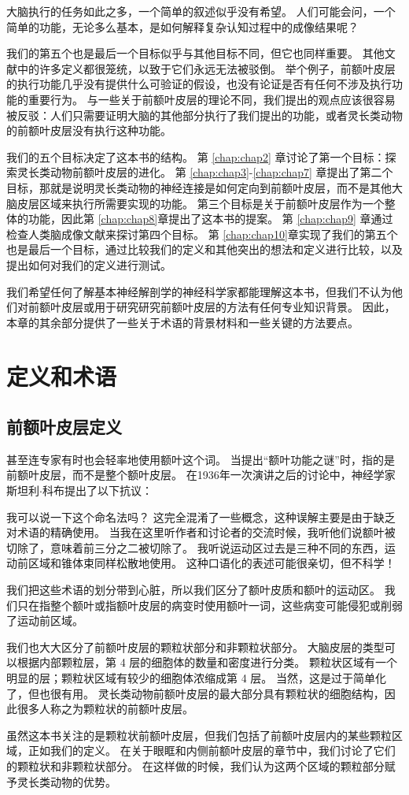 大脑执行的任务如此之多，一个简单的叙述似乎没有希望。
人们可能会问，一个简单的功能，无论多么基本，是如何解释复杂认知过程中的成像结果呢？
\par
我们的第五个也是最后一个目标似乎与其他目标不同，但它也同样重要。
其他文献中的许多定义都很笼统，以致于它们永远无法被驳倒。
举个例子，前额叶皮层的执行功能几乎没有提供什么可验证的假设，也没有论证是否有任何不涉及执行功能的重要行为。
与一些关于前额叶皮层的理论不同，我们提出的观点应该很容易被反驳：人们只需要证明大脑的其他部分执行了我们提出的功能，或者灵长类动物的前额叶皮层没有执行这种功能。
\par
我们的五个目标决定了这本书的结构。
第 \ref{chap:chap2} 章讨论了第一个目标：探索灵长类动物前额叶皮层的进化。
第 \ref{chap:chap3}-\ref{chap:chap7} 章提出了第二个目标，那就是说明灵长类动物的神经连接是如何定向到前额叶皮层，而不是其他大脑皮层区域来执行所需要实现的功能。
第三个目标是关于前额叶皮层作为一个整体的功能，因此第 \ref{chap:chap8}章提出了这本书的提案。
第 \ref{chap:chap9} 章通过检查人类脑成像文献来探讨第四个目标。
第 \ref{chap:chap10}章实现了我们的第五个也是最后一个目标，通过比较我们的定义和其他突出的想法和定义进行比较，以及提出如何对我们的定义进行测试。
\par
我们希望任何了解基本神经解剖学的神经科学家都能理解这本书，但我们不认为他们对前额叶皮层或用于研究研究前额叶皮层的方法有任何专业知识背景。
因此，本章的其余部分提供了一些关于术语的背景材料和一些关键的方法要点。



\section{定义和术语}
\subsection{前额叶皮层定义}
甚至连专家有时也会轻率地使用额叶这个词。
当提出“额叶功能之谜”时，指的是前额叶皮层，而不是整个额叶皮层\cite{teube1964riddle}。
在1936年一次演讲之后的讨论中，神经学家斯坦利$\cdot$科布提出了以下抗议\cite{fulton1932relation}：
\par
我可以说一下这个命名法吗？
这完全混淆了一些概念，这种误解主要是由于缺乏对术语的精确使用。
当我在这里听作者和讨论者的交流时候，我听他们说额叶被切除了，意味着前三分之二被切除了。
我听说运动区过去是三种不同的东西，运动前区域和锥体束同样松散地使用。
这种口语化的表述可能很亲切，但不科学！
\par
我们把这些术语的划分带到心脏，所以我们区分了额叶皮质和额叶的运动区。
我们只在指整个额叶或指额叶皮层的病变时使用额叶一词，这些病变可能侵犯或削弱了运动前区域。
\par
我们也大大区分了前额叶皮层的颗粒状部分和非颗粒状部分。
大脑皮层的类型可以根据内部颗粒层，第 4 层的细胞体的数量和密度进行分类。
颗粒状区域有一个明显的层；颗粒状区域有较少的细胞体浓缩成第 4 层。
当然，这是过于简单化了，但也很有用。
灵长类动物前额叶皮层的最大部分具有颗粒状的细胞结构，因此很多人称之为颗粒状的前额叶皮层。
\par
虽然这本书关注的是颗粒状前额叶皮层，但我们包括了前额叶皮层内的某些颗粒区域，正如我们的定义。
在关于眼眶和内侧前额叶皮层的章节中，我们讨论了它们的颗粒状和非颗粒状部分。
在这样做的时候，我们认为这两个区域的颗粒部分赋予灵长类动物的优势。

